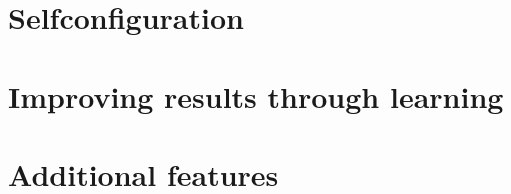 \documentclass[oneside,a4paper,12pt]{memoir}
\begin{document}
\chapter{Selfconfiguration}
\label{selfconfig}

\chapter{Improving results through learning}
\label{learning}

\chapter{Additional features}
\label{features}



\end{document}
